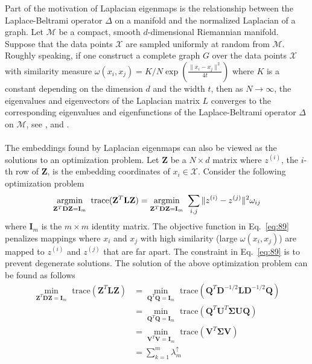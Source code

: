 Part of the motivation of Laplacian eigenmaps is the relationship
between the Laplace-Beltrami operator $\Delta$ on a manifold and the
normalized Laplacian of a graph. Let $\mathcal{M}$ be a compact,
smooth $d$-dimensional Riemannian manifold. Suppose that the data
points $\mathcal{X}$ are sampled uniformly at random from
$\mathcal{M}$. Roughly speaking, if one construct a complete graph $G$
over the data points $\mathcal{X}$ with similarity measure
$\omega(x_i,x_j) = K/N \exp{(\tfrac{\|x_i - x_j\|^2}{4t})}$ where $K$
is a constant depending on the dimension $d$ and the width $t$, then
as $N \rightarrow \infty$, the eigenvalues and eigenvectors of the
Laplacian matrix $L$ converges to the corresponding eigenvalues and
eigenfunctions of the Laplace-Beltrami operator $\Delta$ on
$\mathcal{M}$, see \citet{belkin08:_towar_theor_found_laplac}, and
\citet{belkin06:_conver_laplac_eigen}. \\ \\
%
%
\noindent The embeddings found by Laplacian eigenmaps can also be
viewed as the solutions to an optimization problem. Let
$\mathbf{Z}$ be a $N \times d$ matrix where $z^{(i)}$, the $i$-th
row of $\mathbf{Z}$, is the embedding coordinates of $x_i \in
\mathcal{X}$. Consider the following optimization problem
\begin{equation}
  \label{eq:89}
  \argmin_{\mathbf{Z}^{T}\mathbf{D} \mathbf{Z} = \mathbf{I}_m}{\,\,
    \mathrm{trace}(\mathbf{Z}^{T} \mathbf{L} \mathbf{Z})}
  = \argmin_{\mathbf{Z}^{T}\mathbf{D} \mathbf{Z} = \mathbf{I}_m}{\,\,
    \sum_{i,j}{ \|z^{(i)} - z^{(j)}\|^{2} \omega_{ij}}}
\end{equation}
where $\mathbf{I}_m$ is the $m \times m$ identity matrix. The
objective function in Eq.~\eqref{eq:89} penalizes mappings where $x_i$
and $x_j$ with high similarity (large $\omega(x_i,x_j)$) are mapped to
$z^{(i)}$ and $z^{(j)}$ that are far apart. The constraint in
Eq.~\eqref{eq:89} is to prevent degenerate solutions. The solution of
the above optimization problem can be found as follows
 \begin{equation}
   \label{eq:90}
   \begin{split}
     \min_{\mathbf{Z}^{T}\mathbf{D} \mathbf{Z} = \mathbf{I}_m}{\,\,
       \mathrm{trace}(\mathbf{Z}^{T} \mathbf{L} \mathbf{Z})} &=
     \min_{\mathbf{Q}^{T}\mathbf{Q} = \mathbf{I}_m}{\,\,
       \mathrm{trace}(\mathbf{Q}^{T} \mathbf{D}^{-1/2} \mathbf{L}
       \mathbf{D}^{-1/2} \mathbf{Q})} \\
     &= \min_{\mathbf{Q}^{T}\mathbf{Q} = \mathbf{I}_m}{\, \,
       \mathrm{trace}(\mathbf{Q}^{T} \mathbf{U}^{T} \bm{\Sigma}
       \mathbf{U} \mathbf{Q})} \\
     &= \min_{\mathbf{V}^{T}\mathbf{V} = \mathbf{I}_m}{\, \,
       \mathrm{trace}(\mathbf{V}^{T} \bm{\Sigma}
       \mathbf{V})} \\
     &= \sum_{k=1}^{m}{\lambda^{\uparrow}_m}
   \end{split}
 \end{equation}
